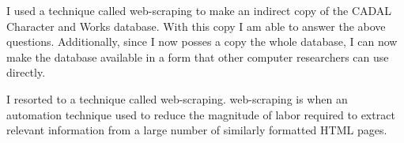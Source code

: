 I used a technique called web-scraping to make an indirect copy of the CADAL Character and Works database.  With this copy I am able to answer the above questions.  Additionally, since I now posses a copy the whole database, I can now make the database available in a form that other computer researchers can use directly.


   I resorted to a technique called web-scraping.  web-scraping is when an automation technique used to reduce the magnitude of labor required to extract relevant information from a large number of similarly formatted HTML pages.






